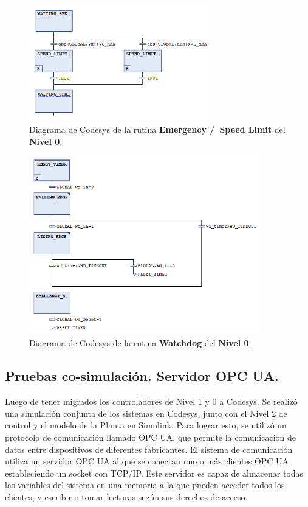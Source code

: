 \documentclass[11pt]{article}
\begin{document}
\begin{figure}
	\centering
	\includegraphics[width=0.7\textwidth]{images/codesys_nivel_0_emergency_speed_limit.png}
	\caption{Diagrama de Codesys de la rutina \textbf{Emergency /\ Speed Limit} del \textbf{Nivel 0}.}
	\label{fig:codesys_nivel_0_emergency_speed_limit}
\end{figure}

\begin{figure}
	\centering
	\includegraphics[width=0.9\textwidth]{images/codesys_nivel_0_watchdog.png}
	\caption{Diagrama de Codesys de la rutina \textbf{Watchdog} del \textbf{Nivel 0}.}
	\label{fig:codesys_nivel_0_watchdog}
\end{figure}

\subsection{Pruebas co-simulación. Servidor OPC UA.}

Luego de tener migrados los controladores de Nivel 1 y 0 a Codesys. Se realizó una simulación conjunta de los sistemas en Codesys, junto con el Nivel 2 de control y el modelo de la Planta en Simulink. Para lograr esto, se utilizó un protocolo de comunicación llamado OPC UA, que permite la comunicación de datos entre dispositivos de diferentes fabricantes. El sistema de comunicación utiliza un servidor OPC UA al que se conectan uno o más clientes OPC UA estableciendo un socket con TCP/IP. Este servidor es capaz de almacenar todas las variables del sistema en una memoria a la que pueden acceder todos los clientes, y escribir o tomar lecturas según sus derechos de acceso.
\end{document}
